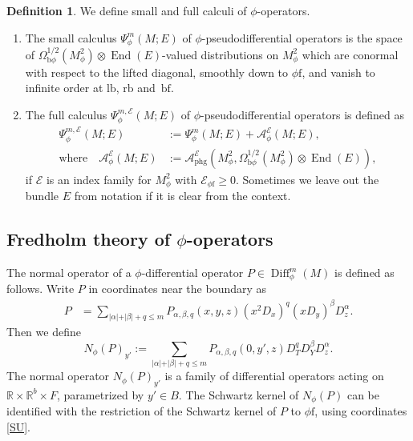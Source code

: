 \documentclass[11pt]{article}
\numberwithin{equation}{section}
\newcommand{\bphi}{{\bb\phi}}
\theoremstyle{plain}
\theoremstyle{definition}
\newtheorem{defn}[Th]{Definition}
\newcommand\calA{{\mathcal A}}
\newcommand\calE{{\mathcal E}}
\newcommand {\phg}{{\mathrm{phg}}}
\newcommand{\phif}{{\phi\mathrm{f}}}
\newcommand{\lf}{{\mathrm{lb}}}
\newcommand{\rf}{{\mathrm{rb}}}
\newcommand{\bb}{{\mathrm{b}}}
\newcommand{\bbf}{{\mathrm{bf}}}
\DeclareMathOperator{\Diff}{Diff}
\DeclareMathOperator{\End}{End}
\begin{document}
\begin{defn}\label{phi-calculus-basic} We define small and full calculi of $\phi$-operators.
\begin{enumerate}
\item
The small calculus $\Psi_\phi^m(M; E)$ of $\phi$-pseudodifferential operators is the
space of $\Omega^{1/2}_{\bphi}(M^2_\phi) \otimes \End(E)$-valued
distributions on $M^2_\phi$ which are conormal with
respect to the lifted diagonal, smoothly down to $\phif$, and vanish to infinite order at $\lf$, $\rf$ and~$\bbf$.
\item
The full calculus $\Psi_\phi^{m,\calE}(M; E)$ of $\phi$-pseudodifferential operators is defined as
\begin{align*}
\Psi_\phi^{m,\calE}(M; E) &:= \Psi_\phi^{m}(M; E) + \calA_{\phi}^\calE(M;E), \\
\text{where} \quad \calA_{\phi}^\calE(M;E)&:= \calA_{\phg}^\calE(M^2_\phi,
\Omega^{1/2}_{\bphi}(M^2_\phi) \otimes \End(E)),
\end{align*}
if $\calE$ is an index family for $M^2_\phi$ with $\calE_{\phif}\geq 0$.
Sometimes we leave out the bundle $E$ from notation if it is clear from the context.
\end{enumerate}
\end{defn}

\subsection{Fredholm theory of \texorpdfstring{$\phi$}{phi}-operators}\label{normal op}
The normal operator of a $\phi$-differential operator
$P \in \Diff_{\phi}^{m}(M)$ is defined as follows. Write $P$ in coordinates near the boundary as
\begin{align*}
P &= \sum_{\vert \alpha \vert + \vert \beta \vert + q \leq m}
P_{\alpha,\beta,q}(x,y,z)(x^{2}D_{x})^{q}(xD_{y})^\beta D_{z}^{\alpha}.
\end{align*}
Then we define
\begin{equation}
\label{eqn:normal family def}
N_{\phi}(P)_{y'} :=
\sum_{\vert \alpha \vert + \vert \beta \vert + q \leq m}
P_{\alpha,\beta,q}(0,y',z) D^q_T D^\beta_Y D_{z}^{\alpha}.
\end{equation}
The normal operator $N_{\phi}(P)_{y'}$ is a family of differential operators acting on
$\mathbb{R}\times\mathbb{R}^{b}\times F$, parametrized by $y'\in B$. The Schwartz kernel of $N_\phi(P)$ can be identified with the restriction of the Schwartz kernel of $P$ to $\phif$, using coordinates \eqref{SU}.
\end{document}
